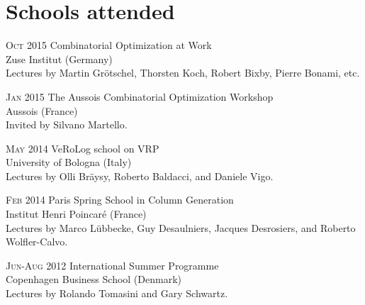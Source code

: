 \section*{Schools attended}

\begin{paracol}{2}
  \textsc{Oct 2015}
\switchcolumn
  Combinatorial Optimization at Work\\
  Zuse Institut (Germany)
  {\scriptsize\\
    Lectures by Martin Grötschel, Thorsten Koch, Robert Bixby, Pierre Bonami, etc.
  }
\end{paracol}

\begin{paracol}{2}
  \textsc{Jan 2015}
\switchcolumn
  The Aussois Combinatorial Optimization Workshop\\
  Aussois (France)
  {\scriptsize\\
    Invited by Silvano Martello.
  }
\end{paracol}

\begin{paracol}{2}
  \textsc{May 2014}
\switchcolumn
  VeRoLog school on VRP\\
  University of Bologna (Italy)
  {\scriptsize\\
    Lectures by Olli Bräysy, Roberto Baldacci, and Daniele Vigo.
  }
\end{paracol}

\begin{paracol}{2}
  \textsc{Feb 2014}
\switchcolumn
  Paris Spring School in Column Generation\\
  Institut Henri Poincaré (France)
  {\scriptsize\\
    Lectures by Marco Lübbecke, Guy Desaulniers, Jacques Desrosiers, and Roberto Wolfler-Calvo.
  }
\end{paracol}

\begin{paracol}{2}
  \textsc{Jun-Aug 2012}
\switchcolumn
  International Summer Programme\\
  Copenhagen Business School (Denmark)
  {\scriptsize\\
    Lectures by Rolando Tomasini and Gary Schwartz.
  }
\end{paracol}

